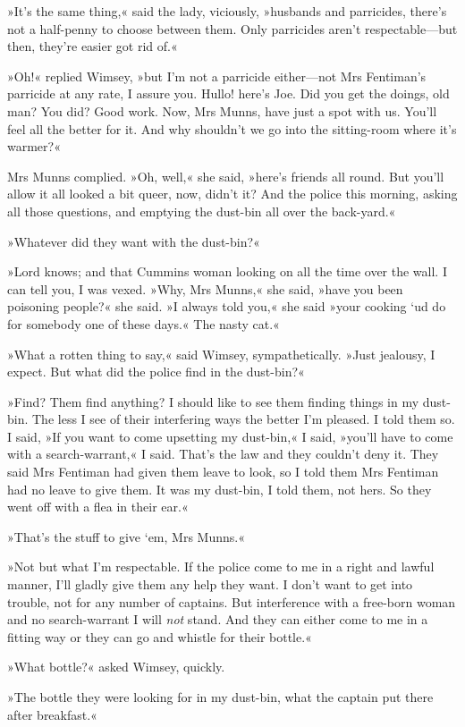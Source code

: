 »It's the same thing,« said the lady, viciously, »husbands and parricides, there's not a half-penny to choose between them. Only parricides aren't respectable—but then, they're easier got rid of.«

»Oh!« replied Wimsey, »but I'm not a parricide either—not Mrs Fentiman's parricide at any rate, I assure you. Hullo! here's Joe. Did you get the doings, old man? You did? Good work. Now, Mrs Munns, have just a spot with us. You'll feel all the better for it. And why shouldn't we go into the sitting-room where it's warmer?«

Mrs Munns complied. »Oh, well,« she said, »here's friends all round. But you'll allow it all looked a bit queer, now, didn't it? And the police this morning, asking all those questions, and emptying the dust-bin all over the back-yard.«

»Whatever did they want with the dust-bin?«

»Lord knows; and that Cummins woman looking on all the time over the wall. I can tell you, I was vexed. »Why, Mrs Munns,« she said, »have you been poisoning people?« she said. »I always told you,« she said »your cooking `ud do for somebody one of these days.« The nasty cat.«

»What a rotten thing to say,« said Wimsey, sympathetically. »Just jealousy, I expect. But what did the police find in the dust-bin?«

»Find? Them find anything? I should like to see them finding things in my dust-bin. The less I see of their interfering ways the better I'm pleased. I told them so. I said, »If you want to come upsetting my dust-bin,« I said, »you'll have to come with a search-warrant,« I said. That's the law and they couldn't deny it. They said Mrs Fentiman had given them leave to look, so I told them Mrs Fentiman had no leave to give them. It was my dust-bin, I told them, not hers. So they went off with a flea in their ear.«

»That's the stuff to give `em, Mrs Munns.«

»Not but what I'm respectable. If the police come to me in a right and lawful manner, I'll gladly give them any help they want. I don't want to get into trouble, not for any number of captains. But interference with a free-born woman and no search-warrant I will \textit{not} stand. And they can either come to me in a fitting way or they can go and whistle for their bottle.«

»What bottle?« asked Wimsey, quickly.

»The bottle they were looking for in my dust-bin, what the captain put there after breakfast.«

